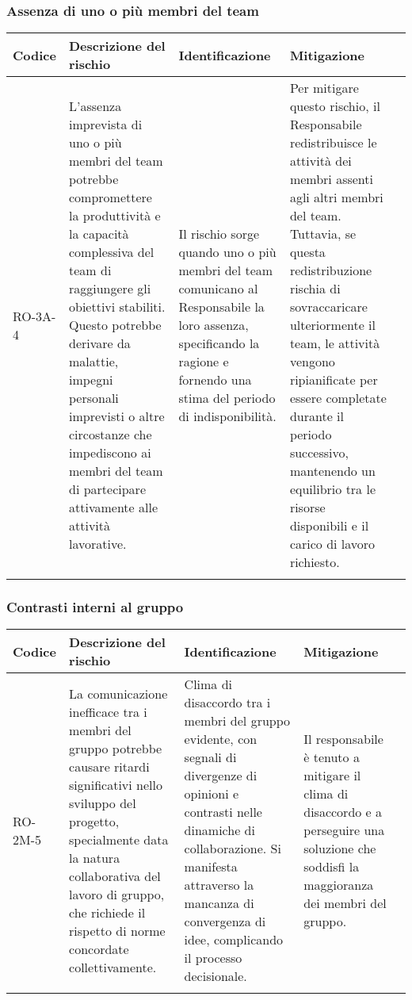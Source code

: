 \subsubsection{Assenza di uno o più membri del team} \label{subsubsec:assenzaMembri}
\begin{table}[H]
    \centering
    \begin{tabularx}{\textwidth}{l>{\RaggedRight}X>{\RaggedRight}X>{\RaggedRight}X>{\RaggedRight}X}
    \toprule
    \rowcolor{gray!50}
    \textbf{Codice} & \textbf{Descrizione del rischio} & \textbf{Identificazione} & \textbf{Mitigazione} \\
    \midrule
    \addlinespace 
    RO-3A-4 & 
    L'assenza imprevista di uno o più membri del team potrebbe compromettere la produttività e la capacità complessiva del team di raggiungere gli obiettivi stabiliti. Questo potrebbe derivare da malattie, impegni personali imprevisti o altre circostanze che impediscono ai membri del team di partecipare attivamente alle attività lavorative. &
    Il rischio sorge quando uno o più membri del team comunicano al Responsabile la loro assenza, specificando la ragione e fornendo una stima del periodo di indisponibilità. &
    Per mitigare questo rischio, il Responsabile redistribuisce le attività dei membri assenti agli altri membri del team. Tuttavia, se questa redistribuzione rischia di sovraccaricare ulteriormente il team, le attività vengono ripianificate per essere completate durante il periodo successivo, mantenendo un equilibrio tra le risorse disponibili e il carico di lavoro richiesto.\\
    \bottomrule
    \addlinespace 
    \end{tabularx}
\end{table}

\subsubsection{Contrasti interni al gruppo} \label{subsubsec:contrastiInterni}
\begin{table}[H]
    \centering
    \begin{tabularx}{\textwidth}{l>{\RaggedRight}X>{\RaggedRight}X>{\RaggedRight}X>{\RaggedRight}X}
    \toprule
    \rowcolor{gray!50}
    \textbf{Codice} & \textbf{Descrizione del rischio} & \textbf{Identificazione} & \textbf{Mitigazione} \\
    \midrule
    \addlinespace 
    RO-2M-5 & 
    La comunicazione inefficace tra i membri del gruppo potrebbe causare ritardi significativi nello sviluppo del progetto, specialmente data la natura collaborativa del lavoro di gruppo, che richiede il rispetto di norme concordate collettivamente.& 
    Clima di disaccordo tra i membri del gruppo evidente, con segnali di divergenze di opinioni e contrasti nelle dinamiche di collaborazione. Si manifesta attraverso la mancanza di convergenza di idee, complicando il processo decisionale. &
    Il responsabile è tenuto a mitigare il clima di disaccordo e a perseguire una soluzione che soddisfi la maggioranza dei membri del gruppo.\\
    \bottomrule
    \addlinespace 
    \end{tabularx}
\end{table}

